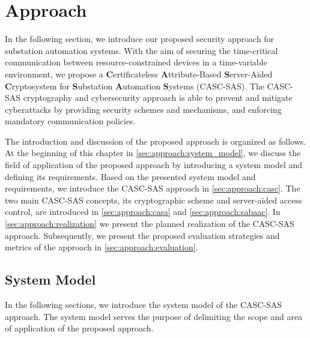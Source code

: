 \chapter{Approach}
\label{ch:approach}
In the following section, we introduce our proposed security approach for substation automation systems.
With the aim of securing the time-critical communication between resource-constrained devices in a time-variable environment, we propose a \textbf{C}ertificateless \textbf{A}ttribute-Based \textbf{S}erver-Aided \textbf{C}ryptosystem for \textbf{S}ubstation \textbf{A}utomation \textbf{S}ystems (CASC-SAS).
The CASC-SAS cryptography and cybersecurity approach is able to prevent and mitigate cyberattacks by providing security schemes and mechanisms, and enforcing mandatory communication policies.

The introduction and discussion of the proposed approach is organized as follows.
At the beginning of this chapter in \autoref{sec:approach:system_model}, we discuss the field of application of the proposed approach by introducing a system model and defining its requirements.
Based on the presented system model and requirements, we introduce the CASC-SAS approach in \autoref{sec:approach:casc}.
The two main CASC-SAS concepts, its cryptographic scheme and server-aided access control, are introduced in \autoref{sec:approach:casa} and \autoref{sec:approach:sabaac}.
In \autoref{sec:approach:realization} we present the planned realization of the CASC-SAS approach.
Subsequently, we present the proposed evaluation strategies and metrics of the approach in \autoref{sec:approach:evaluation}.

\section{System Model}
\label{sec:approach:system_model}
In the following sections, we introduce the system model of the CASC-SAS approach.
The system model serves the purpose of delimiting the scope and area of application of the proposed approach.


